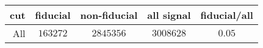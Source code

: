 \begin{tabular}{r|c|c|c|c}
cut&fiducial&non-fiducial&all signal&fiducial/all\\
\hline
All&$163272$&$2845356$&$3008628$&$0.05$\\
\end{tabular}
